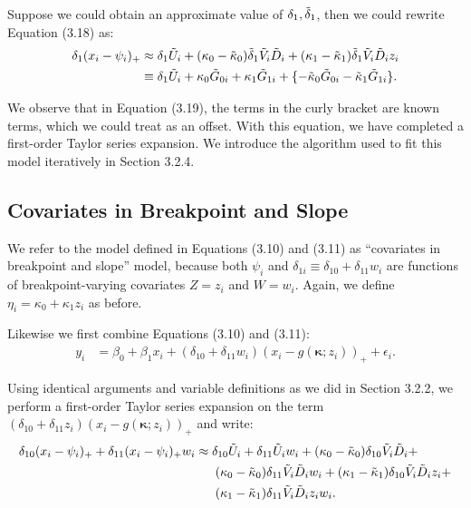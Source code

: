 \documentclass [12pt, proquest] {uwthesis}[2016/11/22]
\begin{document}
Suppose we could obtain an approximate value of $\delta_1, \Tilde{\delta}_1$, then we could rewrite Equation (3.18) as:
\begin{align}
    \delta_1 (x_i - \psi_i)_+ &\approx \delta_1 \Tilde{U}_i + (\kappa_0 - \Tilde{\kappa}_0) \Tilde{\delta}_1 \Tilde{V}_i \Tilde{D}_i + (\kappa_1 - \Tilde{\kappa}_1) \Tilde{\delta}_1 \Tilde{V}_i \Tilde{D}_i z_i \nonumber \\
    &\equiv \delta_1 \Tilde{U}_i + \kappa_0 \Tilde{G}_{0i} + \kappa_1 \Tilde{G}_{1i} + \{ -\Tilde{\kappa}_0 \Tilde{G}_{0i} -\Tilde{\kappa}_1 \Tilde{G}_{1i}\}.
\end{align}

We observe that in Equation (3.19), the terms in the curly bracket are known terms, which we could treat as an offset. With this equation, we have completed a first-order Taylor series expansion. We introduce the algorithm used to fit this model iteratively in Section 3.2.4.

\subsection{Covariates in Breakpoint and Slope}
We refer to the model defined in Equations (3.10) and (3.11) as ``covariates in breakpoint and slope'' model, because both $\psi_i$ and $\delta_{1i} \equiv \delta_{10} + \delta_{11} w_i$ are functions of breakpoint-varying covariates $Z = z_i$ and $W = w_i$. Again, we define $\eta_i = \kappa_0 + \kappa_1 z_i$ as before.

Likewise we first combine Equations (3.10) and (3.11):
\begin{align}
    y_i &= \beta_0 + \beta_1 x_i + (\delta_{10} + \delta_{11} w_i) (x_i - g(\bm{\kappa}; z_i))_+ + \epsilon_i.
\end{align}

Using identical arguments and variable definitions as we did in Section 3.2.2, we perform a first-order Taylor series expansion on the term $(\delta_{10} + \delta_{11} z_i) (x_i - g(\bm{\kappa}; z_i))_+$ and write:
\begin{align}
    \delta_{10} (x_i - \psi_i)_+ + \delta_{11} (x_i - \psi_i)_+ w_i &\approx \delta_{10} \Tilde{U}_i + \delta_{11} \Tilde{U}_i w_i + (\kappa_0 - \Tilde{\kappa}_0) \delta_{10} \Tilde{V}_i \Tilde{D}_i + \nonumber \\
    & \hspace{0.22in} (\kappa_0 - \Tilde{\kappa}_0) \delta_{11} \Tilde{V}_i \Tilde{D}_i w_i + (\kappa_1 - \Tilde{\kappa}_1) \delta_{10} \Tilde{V}_i \Tilde{D}_i z_i + \nonumber \\
    & \hspace{0.22in} (\kappa_1 - \Tilde{\kappa}_1) \delta_{11} \Tilde{V}_i \Tilde{D}_i z_i w_i. \nonumber
\end{align}
\end{document}

